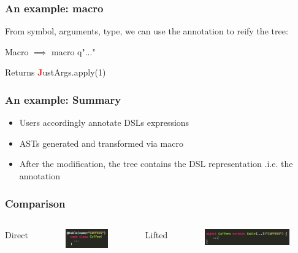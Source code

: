 \documentclass{beamer}
\newcommand{\TCR}{\textcolor{red}}
\begin{document}

\begin{frame}
\frametitle{An example: macro}

From symbol, arguments, type, we can use the annotation to reify the tree:
\begin{block}{Macro}
 $\implies$ macro q"..."
\end{block}

\begin{block}{Returns}
\TCR{\textbf{J}}ustArgs.apply(1)
\end{block}

\end{frame}


\begin{frame}
\frametitle{An example: Summary}

\begin{itemize}
\item Users accordingly annotate DSLs expressions
\item ASTs generated and transformed via macro
\item After the modification, the tree contains the DSL representation .i.e. the annotation
\end{itemize}

\end{frame}


\begin{frame}
\frametitle{Comparison}
\begin{columns}[c] %
Direct
\begin{figure}
\includegraphics[width=0.8\linewidth]{./img/annotSlick.png}
\end{figure}

Lifted
\begin{figure}
\includegraphics[width=1.0\linewidth]{./img/lift.png}
\end{figure}

\end{columns}
\end{frame}
\end{document}

